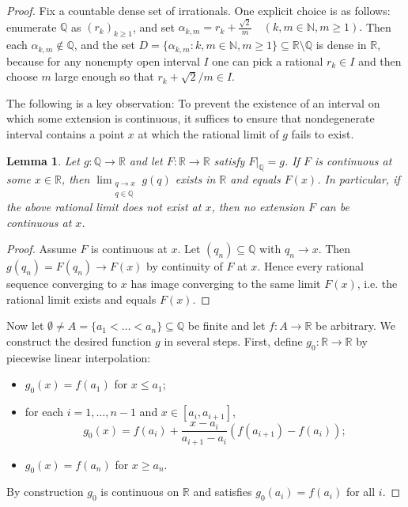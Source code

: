 \documentclass[10pt,a4paper]{amsart}
\newtheorem{lemma}{Lemma}
\begin{document}
\begin{proof}
Fix a countable dense set of irrationals. One explicit choice is as
follows: enumerate $\mathbb{Q}$ as $(r_k)_{k\ge 1}$, and set $\alpha_{k,m} = r_k + \frac{\sqrt{2}}{m} \quad (k,m\in\mathbb{N}, m\ge 1).$
Then each $\alpha_{k,m}\notin\mathbb{Q}$, and the set $D = \{\alpha_{k,m} : k,m\in\mathbb{N}, m\ge 1\} \subseteq \mathbb{R}\setminus\mathbb{Q}$
is dense in $\mathbb{R}$, because for any nonempty open interval $I$ one can pick a rational
$r_k\in I$ and then choose $m$ large enough so that $r_k+\sqrt{2}/m\in I$.

The following is a key observation: To prevent the existence of an interval on which some extension is continuous, it suffices to ensure that  nondegenerate interval contains a point $x$
at which the rational limit of $g$ fails to exist. 

\begin{lemma} 
Let $g:\mathbb{Q}\rightarrow\mathbb{R}$ and let $F:\mathbb{R}\rightarrow\mathbb{R}$ satisfy $F|_{\mathbb{Q}}=g$. If $F$ is
continuous at some $x\in\mathbb{R}$, then
$ \lim_{\substack{q\rightarrow x\\ q\in\mathbb{Q}}} g(q)$
exists in $\mathbb{R}$ and equals $F(x)$. In particular, if the above rational limit does not exist
at $x$, then no extension $F$ can be continuous at $x$.
\label{lemma:extension}
\end{lemma}

\begin{proof}
Assume $F$ is continuous at $x$. Let $(q_n)\subseteq\mathbb{Q}$ with $q_n\rightarrow x$. Then $g(q_n)=F(q_n)\rightarrow F(x)$ by continuity of $F$ at $x$. Hence every rational sequence converging
to $x$ has image converging to the same limit $F(x)$, i.e. the rational limit exists
and equals $F(x)$.
\end{proof}



Now let $\emptyset \neq A = \{a_1 < \dots < a_n\} \subseteq \mathbb{Q}$ be finite and let $f:A\rightarrow\mathbb{R}$ be arbitrary. We construct the desired function $g$ in several steps.  
First, define $g_0:\mathbb{R}\rightarrow\mathbb{R}$ by
piecewise linear interpolation:
\begin{itemize}
\item $g_0(x) = f(a_1)$ for $x\le a_1$;
\item for each $i=1,\dots,n-1$ and $x\in[a_i, a_{i+1}]$,
\begin{equation} g_0(x) = f(a_i) + \frac{x-a_i}{a_{i+1}-a_i} (f(a_{i+1})-f(a_i)); 
\end{equation} 
\item $g_0(x) = f(a_n)$ for $x\ge a_n$.
\end{itemize}
By construction $g_0$ is continuous on $\mathbb{R}$ and satisfies $g_0(a_i) = f(a_i)$ for all $i$.



\end{proof}
\end{document}
